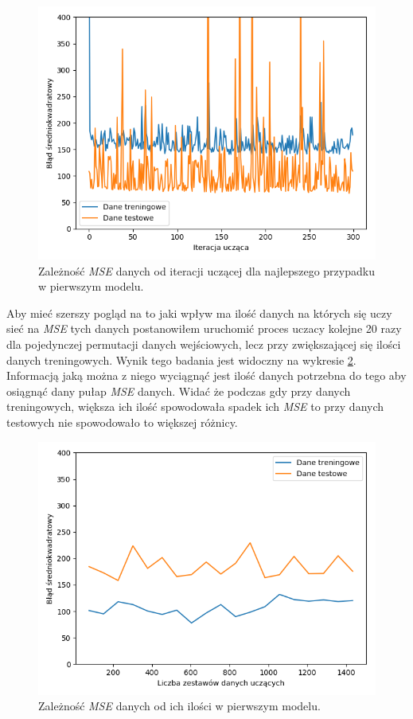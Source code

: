 \documentclass[12pt]{aghdpl}
\newenvironment{tightcenter}{
  \setlength\topsep{0pt}
  \setlength\parskip{0pt}
  \begin{center}
}{
  \end{center}
}
\begin{document}
		\begin{figure}[h]
	 		\begin{tightcenter}
	 			\includegraphics[width = 0.75\linewidth]{wykresy/1_pierwszy_model_tworzenie_i_analiza/wykres_uczenia.png}
	 		\end{tightcenter}
	 		
 			\caption{Zależność \textit{MSE} danych od iteracji uczącej dla najlepszego przypadku w pierwszym modelu.}
			\label{fig: pierwszy_model_wykres_uczenia}
		\end{figure}
		
		Aby mieć szerszy pogląd na to jaki wpływ ma ilość danych na których się uczy sieć na \textit{MSE} tych danych postanowiłem	uruchomić proces uczacy kolejne 20 razy dla pojedynczej permutacji danych wejściowych, lecz przy zwiększającej się ilości danych treningowych. Wynik tego badania jest widoczny na wykresie \ref{fig: pierwszy_model_learning_curves}. Informacją jaką można z niego wyciągnąć jest ilość danych potrzebna do tego aby osiągnąć dany pułap \textit{MSE} danych. Widać że podczas gdy przy danych treningowych, większa ich ilość spowodowała spadek ich \textit{MSE} to przy danych testowych nie spowodowało to większej różnicy.
		
		\begin{figure}[h]
	 		\begin{tightcenter}
	 			\includegraphics[width = 0.75\linewidth]{wykresy/1_pierwszy_model_tworzenie_i_analiza/learning_curves.png}
	 		\end{tightcenter}
	 		
 			\caption{Zależność \textit{MSE} danych od ich ilości w pierwszym modelu.}
			\label{fig: pierwszy_model_learning_curves}
		\end{figure}
		
\end{document}
